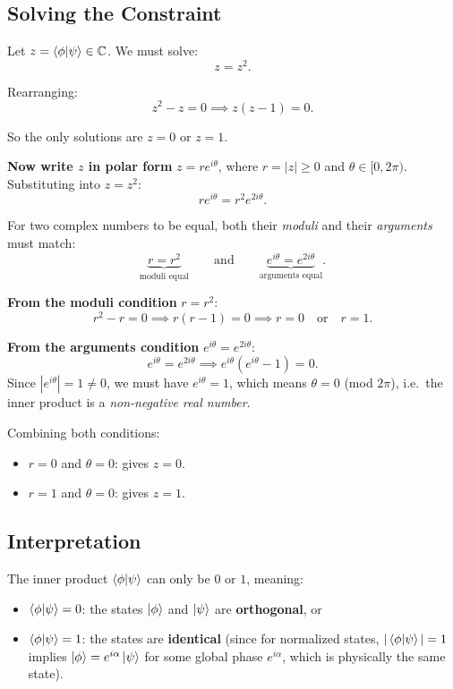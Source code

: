 \documentclass[12pt]{article}
\begin{document}
\subsection{Solving the Constraint}

Let $z = \braket{\phi}{\psi} \in \mathbb{C}$. We must solve:
\[
z = z^2.
\]

Rearranging:
\[
z^2 - z = 0 \implies z(z - 1) = 0.
\]

So the only solutions are $z = 0$ or $z = 1$.

\textbf{Now write $z$ in polar form} $z = r e^{i\theta}$, where $r = |z| \geq 0$
and $\theta \in [0, 2\pi)$. Substituting into $z = z^2$:
\[
r e^{i\theta} = r^2 e^{2i\theta}.
\]

For two complex numbers to be equal, both their \emph{moduli} and 
their \emph{arguments} must match:
\[
\underbrace{r = r^2}_{\text{moduli equal}} \qquad \text{and} \qquad
\underbrace{e^{i\theta} = e^{2i\theta}}_{\text{arguments equal}}.
\]

\textbf{From the moduli condition} $r = r^2$:
\[
r^2 - r = 0 \implies r(r-1) = 0 \implies r = 0 \quad \text{or} \quad r = 1.
\]

\textbf{From the arguments condition} $e^{i\theta} = e^{2i\theta}$:
\[
e^{i\theta} = e^{2i\theta} \implies e^{i\theta}(e^{i\theta} - 1) = 0.
\]
Since $|e^{i\theta}| = 1 \neq 0$, we must have $e^{i\theta} = 1$, 
which means $\theta = 0$ (mod $2\pi$), i.e.\ the inner product is a 
\emph{non-negative real number}.

Combining both conditions:
\begin{itemize}
    \item $r = 0$ and $\theta = 0$: gives $z = 0$.
    \item $r = 1$ and $\theta = 0$: gives $z = 1$.
\end{itemize}

\subsection{Interpretation}

The inner product $\braket{\phi}{\psi}$ can only be $0$ or $1$, meaning:
\begin{itemize}
    \item $\braket{\phi}{\psi} = 0$: the states $\ket{\phi}$ and $\ket{\psi}$ 
    are \textbf{orthogonal}, or
    \item $\braket{\phi}{\psi} = 1$: the states are \textbf{identical} 
    (since for normalized states, $|\braket{\phi}{\psi}| = 1$ implies 
    $\ket{\phi} = e^{i\alpha}\ket{\psi}$ for some global phase $e^{i\alpha}$, 
    which is physically the same state).
\end{itemize}
\end{document}
